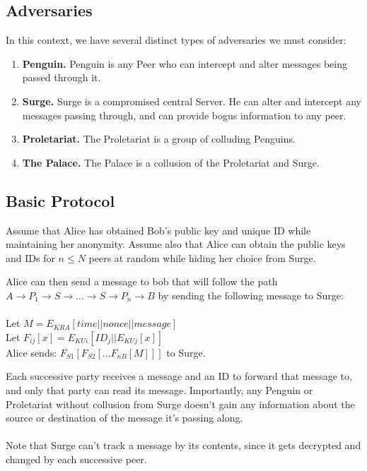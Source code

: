 \documentclass{paper}
\begin{document}
\subsection{Adversaries}
In this context, we have several distinct types of adversaries we must consider:
\begin{enumerate}
  \item\textbf{Penguin.} Penguin is any Peer who can intercept and alter messages being passed through it. 
  \item\textbf{Surge.} Surge is a compromised central Server. He can alter and intercept any messages passing through, and can provide bogus information to any peer.
  \item\textbf{Proletariat.} The Proletariat is a group of colluding Penguins.
  \item\textbf{The Palace.} The Palace is a collusion of the Proletariat and Surge.
\end{enumerate}
\subsection{Basic Protocol}
Assume that Alice has obtained Bob's public key and unique ID while maintaining her anonymity. Assume also that Alice can obtain the public keys and IDs for $n \le N$ peers at random while hiding her choice from Surge. 

Alice can then send a message to bob that will follow the path $A \rightarrow P_1 \rightarrow S \rightarrow ... \rightarrow S \rightarrow P_n \rightarrow B$ by sending the following message to Surge: 
\\\\
Let $M = E_{KRA}[  time || nonce || message ]$
\\Let $F_{ij}[x] = E_{KUi}[ ID_j || E_{KUj}[ x ] ]$
\\
Alice sends: $F_{S1}[F_{S2}[...F_{nB}[ M ]]]$ to Surge. 

Each successive party receives a message and an ID to forward that message to, and only that party can read its message. Importantly, any Penguin or Proletariat without collusion from Surge doesn't gain any information about the source or destination of the message it's passing along. 
\\\\
Note that Surge can't track a message by its contents, since it gets decrypted and changed by each successive peer. 
\end{document}

